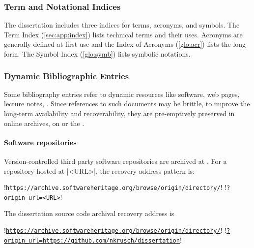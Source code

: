 \subsubsection{Term and Notational Indices}

The dissertation includes three indices for terms, acronyms, and symbols. The
Term Index (\autoref{sec:app:index}) lists technical terms and their uses.
Acronyms are generally defined at first use and the Index of Acronyms
(\autoref{glo:acr}) lists the long form. The Symbol Index (\autoref{glo:symb})
lists symbolic notations.

\subsubsection{Dynamic Bibliographic Entries}
\label{sssec:dyn-bib}

Some bibliography entries refer to dynamic resources like software, web pages,
lecture notes, \etc. Since references to such documents may be brittle, to improve
the long-term availability and recoverability, they are pre-emptively preserved
in online archives, on  or the .

\paragraph*{Software repositories}
Version-controlled third party software repositories are archived at
\href{https://softwareheritage.org}{}. For a repository
hosted at \pr|<URL>|, the recovery address pattern is:

\begin{minipage}{\textwidth}
\begin{browserlisting}
!\texttt{https://archive.softwareheritage.org/browse/origin/directory/}!
!\hspace{2em}\texttt{?origin\_url=<URL>}!
\end{browserlisting}
\end{minipage}

\begin{example}
The dissertation source code archival recovery address is\mbox{}

\begin{minipage}{\textwidth}
\begin{browserlisting}
!\texttt{\href{https://archive.softwareheritage.org/browse/origin/directory/?origin_url=https://github.com/nkrusch/dissertation}{https://archive.softwareheritage.org/browse/origin/directory/}}!
!\hspace{2em}\texttt{\href{https://archive.softwareheritage.org/browse/origin/directory/?origin_url=https://github.com/nkrusch/dissertation}{?origin\_url=https://github.com/nkrusch/dissertation}}!
\end{browserlisting}
\end{minipage}
\end{example}

